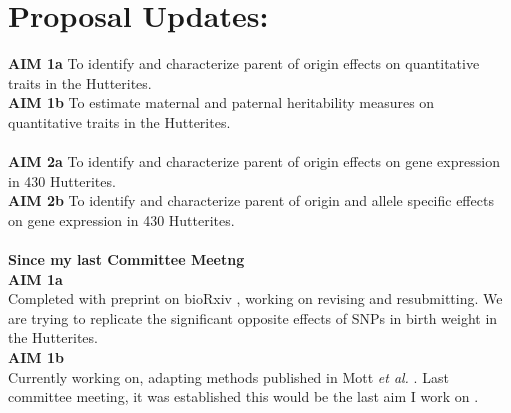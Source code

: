 \documentclass[a4paper, 11pt]{article}
\begin{document}
\section*{Proposal Updates:} %
\textbf{AIM 1a} To identify and characterize parent of origin effects on quantitative traits in the Hutterites. 
\textbf{\\AIM 1b} To estimate maternal and paternal heritability measures on quantitative traits in the Hutterites.\\
 \textbf{\\AIM 2a} To identify and characterize parent of origin effects on gene expression in 430 Hutterites.\\
\textbf{AIM 2b} To identify and characterize parent of origin and allele specific effects on gene expression in 430 Hutterites.\\
\textbf{\\Since my last Committee Meetng}
\textbf{\\AIM 1a}\\
	Completed with preprint on bioRxiv \cite{Mozaffari:dg}, working on revising and resubmitting. We are trying to replicate the significant opposite effects of SNPs in birth weight in the Hutterites.
\textbf{\\AIM 1b}\\
  	Currently working on, adapting methods published in Mott \emph{et al.} \cite{Mott2014}. Last committee meeting, it was established this would be the last aim I work on .
\end{document}
